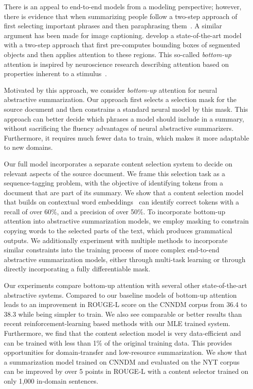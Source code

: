 \documentclass[11pt,a4paper]{article}
\begin{document}
There is an appeal to end-to-end models from a modeling perspective; however, there is evidence that when summarizing people follow a two-step approach of first selecting important phrases and then paraphrasing them~\citep{anderson1988teaching,jing1999decomposition}.
A similar argument has been made for image captioning. \citet{anderson2017bottom} develop a state-of-the-art model with a two-step approach that first pre-computes bounding boxes of segmented objects and then applies attention to these regions. 
This so-called \textit{bottom-up} attention is inspired by neuroscience research describing attention based on properties inherent to a stimulus~\citep{buschman2007top}. 



Motivated by this approach, we consider \textit{bottom-up} attention for neural abstractive summarization. Our approach first selects a selection mask for the source document and then constrains a standard neural model by this mask. This approach can better decide which phrases a model should include in a summary, without sacrificing the fluency advantages of neural abstractive summarizers. Furthermore, it requires much fewer data to train, which makes it more adaptable to new domains.

Our full model incorporates a separate content selection system to decide on relevant aspects of the source document. 
We frame this selection task as a sequence-tagging problem, with the objective of identifying tokens from a document that are part of its summary. We show that a content selection model that builds on contextual word embeddings~\citep{peters2018deep} can identify correct tokens with a recall of over 60\%, and a precision of over 50\%.  To incorporate bottom-up attention into abstractive summarization models, we employ masking to constrain copying words to the selected parts of the text, which produces grammatical outputs. We additionally experiment with multiple methods to incorporate similar constraints into the training process of more complex end-to-end abstractive summarization models, either through multi-task learning or through directly incorporating a fully differentiable mask.

Our experiments compare bottom-up attention with several other state-of-the-art abstractive systems. 
Compared to our baseline models of \citet{see2017get} bottom-up attention leads to an improvement in \acrshort{ROUGE-L} score on the \gls{CNNDM} corpus from 36.4 to 38.3 while being simpler to train. We also see comparable or better results than recent reinforcement-learning based methods with our MLE trained system. 
Furthermore, we find that the content selection model is very data-efficient and can be trained with less than 1\% of the original training data. This provides opportunities for domain-transfer and low-resource summarization. We show that a summarization model trained on \gls{CNNDM} and evaluated on the NYT corpus can be improved by over 5 points in \acrshort{ROUGE-L} with a content selector trained on only 1,000 in-domain sentences.  
\end{document}
